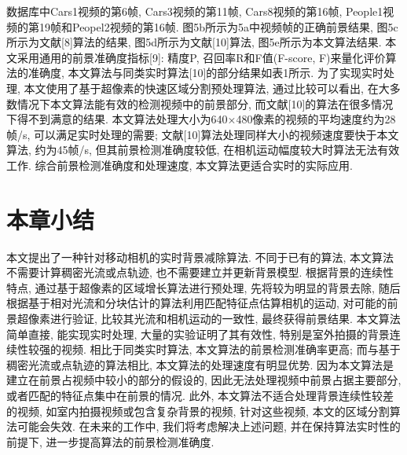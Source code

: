 数据库中Cars1视频的第6帧, Cars3视频的第11帧, Cars8视频的第16帧, People1视频的第19帧和Peopel2视频的第16帧. 图5b所示为5a中视频帧的正确前景结果, 图5c所示为文献[8]算法的结果, 图5d所示为文献[10]算法, 图5e所示为本文算法结果. 本文采用通用的前景准确度指标[9]: 精度P, 召回率R和F值(F-score, F)来量化评价算法的准确度, 本文算法与同类实时算法[10]的部分结果如表1所示. 为了实现实时处理, 本文使用了基于超像素的快速区域分割预处理算法, 通过比较可以看出, 在大多数情况下本文算法能有效的检测视频中的前景部分, 而文献[10]的算法在很多情况下得不到满意的结果.
本文算法处理大小为640×480像素的视频的平均速度约为28帧/s, 可以满足实时处理的需要; 文献[10]算法处理同样大小的视频速度要快于本文算法, 约为45帧/s, 但其前景检测准确度较低, 在相机运动幅度较大时算法无法有效工作. 综合前景检测准确度和处理速度, 本文算法更适合实时的实际应用.


\section{本章小结}
\label{ch5:sec:conclusions}
本文提出了一种针对移动相机的实时背景减除算法. 不同于已有的算法, 本文算法不需要计算稠密光流或点轨迹, 也不需要建立并更新背景模型. 根据背景的连续性特点, 通过基于超像素的区域增长算法进行预处理, 先将较为明显的背景去除, 随后根据基于相对光流和分块估计的算法利用匹配特征点估算相机的运动, 对可能的前景超像素进行验证, 比较其光流和相机运动的一致性, 最终获得前景结果. 本文算法简单直接, 能实现实时处理, 大量的实验证明了其有效性, 特别是室外拍摄的背景连续性较强的视频. 相比于同类实时算法, 本文算法的前景检测准确率更高; 而与基于稠密光流或点轨迹的算法相比, 本文算法的处理速度有明显优势.
因为本文算法是建立在前景占视频中较小的部分的假设的, 因此无法处理视频中前景占据主要部分, 或者匹配的特征点集中在前景的情况. 此外, 本文算法不适合处理背景连续性较差的视频, 如室内拍摄视频或包含复杂背景的视频, 针对这些视频, 本文的区域分割算法可能会失效. 在未来的工作中, 我们将考虑解决上述问题, 并在保持算法实时性的前提下, 进一步提高算法的前景检测准确度.
